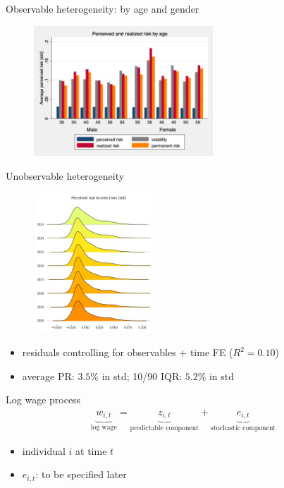 \documentclass{beamer}
\begin{document}
\begin{frame}{Observable heterogeneity: by age and gender}
	\label{observable_heterogeneity_by_age}
	\begin{figure}[ht]
		\label{compare_by_gender_age}
		\centering
		\includegraphics[width=0.60\textwidth]{figures/boxplot_rvar_compare_age.png}
	\end{figure}
\end{frame}


\begin{frame}{Unobservable heterogeneity}
	\begin{figure}
		\centering
		\label{rincstd_hist}
			\includegraphics[width=0.4\textwidth]{figures/joy_rincstd.jpg}
	\end{figure}
	\begin{itemize}
		\item  residuals controlling for observables $+$ time FE ($R^2=0.10$) 
		\item average PR:  $3.5\%$ in std; 10/90 IQR: $5.2\%$ in std \quad \hyperlink{appendix:incstd}{}  
	\end{itemize}
\end{frame}


\begin{frame}{Log wage process}
	\begin{equation*}
		\begin{split}
			\underbrace{w_{i,t}}_{\text{log wage}} = \underbrace{z_{i,t}}_{\text{predictable component}}  + \underbrace{e_{i,t}}_{\text{stochastic component}}
		\end{split} 
	\end{equation*}
	
	\begin{itemize}
		\item individual \(i\) at time \(t\) 
		\item $e_{i,t}$: to be specified later
	\end{itemize}
\end{frame}
\end{document}
